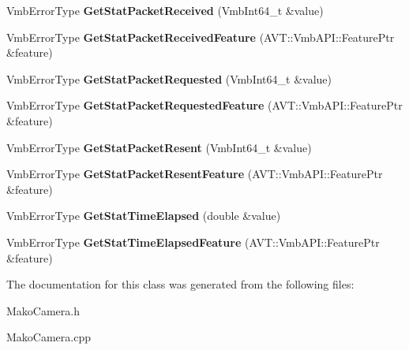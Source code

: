 \begin{DoxyCompactItemize}
\item 
\hypertarget{classMakoCamera_a4e76ff01f5085258836b5e76981f629b}{Vmb\-Error\-Type {\bfseries Get\-Stat\-Packet\-Received} (Vmb\-Int64\-\_\-t \&value)}\label{classMakoCamera_a4e76ff01f5085258836b5e76981f629b}

\item 
\hypertarget{classMakoCamera_aa5ad4fec205206541cfc31cc3e0ca09b}{Vmb\-Error\-Type {\bfseries Get\-Stat\-Packet\-Received\-Feature} (A\-V\-T\-::\-Vmb\-A\-P\-I\-::\-Feature\-Ptr \&feature)}\label{classMakoCamera_aa5ad4fec205206541cfc31cc3e0ca09b}

\item 
\hypertarget{classMakoCamera_a717ac060fe1d4bb8b24fbe070fe14f4d}{Vmb\-Error\-Type {\bfseries Get\-Stat\-Packet\-Requested} (Vmb\-Int64\-\_\-t \&value)}\label{classMakoCamera_a717ac060fe1d4bb8b24fbe070fe14f4d}

\item 
\hypertarget{classMakoCamera_a719e765cd7f52822b4f6c81c5618cce8}{Vmb\-Error\-Type {\bfseries Get\-Stat\-Packet\-Requested\-Feature} (A\-V\-T\-::\-Vmb\-A\-P\-I\-::\-Feature\-Ptr \&feature)}\label{classMakoCamera_a719e765cd7f52822b4f6c81c5618cce8}

\item 
\hypertarget{classMakoCamera_a234da4bb0e5b161efb0bb00cb8ca988c}{Vmb\-Error\-Type {\bfseries Get\-Stat\-Packet\-Resent} (Vmb\-Int64\-\_\-t \&value)}\label{classMakoCamera_a234da4bb0e5b161efb0bb00cb8ca988c}

\item 
\hypertarget{classMakoCamera_afc179e45c86808293c9a8992add8f3cd}{Vmb\-Error\-Type {\bfseries Get\-Stat\-Packet\-Resent\-Feature} (A\-V\-T\-::\-Vmb\-A\-P\-I\-::\-Feature\-Ptr \&feature)}\label{classMakoCamera_afc179e45c86808293c9a8992add8f3cd}

\item 
\hypertarget{classMakoCamera_a3f4690c075593ca8e7f46c0b4e0db48e}{Vmb\-Error\-Type {\bfseries Get\-Stat\-Time\-Elapsed} (double \&value)}\label{classMakoCamera_a3f4690c075593ca8e7f46c0b4e0db48e}

\item 
\hypertarget{classMakoCamera_af8e293aa3dfe5c379709ef76376c6b14}{Vmb\-Error\-Type {\bfseries Get\-Stat\-Time\-Elapsed\-Feature} (A\-V\-T\-::\-Vmb\-A\-P\-I\-::\-Feature\-Ptr \&feature)}\label{classMakoCamera_af8e293aa3dfe5c379709ef76376c6b14}

\end{DoxyCompactItemize}


The documentation for this class was generated from the following files\-:\begin{DoxyCompactItemize}
\item 
Mako\-Camera.\-h\item 
Mako\-Camera.\-cpp\end{DoxyCompactItemize}
